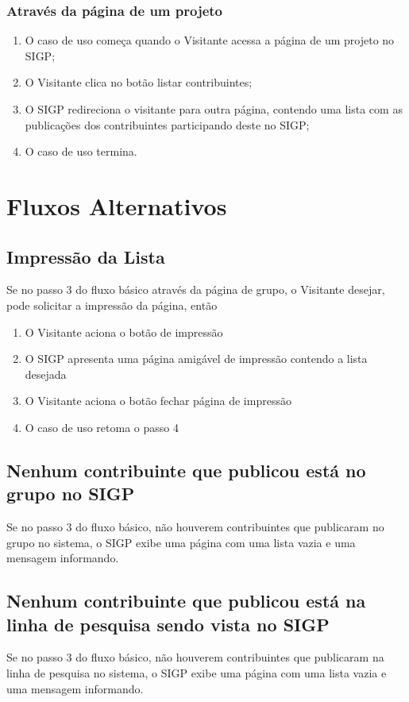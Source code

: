 \documentclass[11pt, a4paper,oneside]{book}
\begin{document}
\subsubsection{Através da página de um projeto}
\begin{enumerate}
\item O caso de uso começa quando o Visitante acessa a página de um projeto no SIGP;
\item O Visitante clica no botão listar contribuintes;
\item O SIGP redireciona o visitante para outra página, contendo uma lista com as publicações dos contribuintes participando deste no SIGP;
\item O caso de uso termina.
\end{enumerate}

\section{Fluxos Alternativos}

\subsection{Impressão da Lista}
Se no passo $3$ do fluxo básico através da página de grupo, o Visitante desejar, pode solicitar a impressão da página, então

\begin{enumerate}
\item O Visitante aciona o botão de impressão
\item O SIGP apresenta uma página amigável de impressão contendo a lista desejada
\item O Visitante aciona o botão fechar página de impressão
\item O caso de uso retoma o passo 4
\end{enumerate}

\subsection{Nenhum contribuinte que publicou está no grupo no SIGP}
Se no passo $3$ do fluxo básico, não houverem contribuintes que publicaram no grupo no sistema, o SIGP exibe uma página com uma lista vazia e uma mensagem informando.

\subsection{Nenhum contribuinte que publicou está na linha de pesquisa sendo vista no SIGP}
Se no passo $3$ do fluxo básico, não houverem contribuintes que publicaram na linha de pesquisa no sistema, o SIGP exibe uma página com uma lista vazia e uma mensagem informando.
\end{document}

